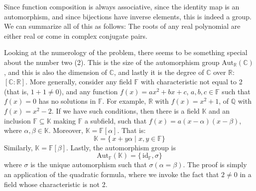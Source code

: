 \documentclass{article}                                                        %
\begin{document}
            Since function composition is always associative, since the identity
            map is an automorphism, and since bijections have inverse elements,
            this is indeed a group. We can summarize all of this as follows:
            The roots of any real polynomial are either real or come in complex
            conjugate pairs.
            \par\hfill\par
            Looking at the numerology of the problem, there seems to be
            something special about the number two (2). This is the size of the
            automorphism group $\textrm{Aut}_{\mathbb{R}}(\mathbb{C})$, and
            this is also the dimension of $\mathbb{C}$, and lastly it is the
            degree of $\mathbb{C}$ over $\mathbb{R}$: $[\mathbb{C}:\mathbb{R}]$.
            More generally, consider any field $\mathbb{F}$ with characteristic
            not equal to 2 (that is, $1+1\ne{0}$), and any function
            $f(x)=ax^{2}+bx+c$, $a,b,c\in\mathbb{F}$ such that $f(x)=0$ has no
            solutions in $\mathbb{F}$. For example, $\mathbb{R}$ with
            $f(x)=x^{2}+1$, of $\mathbb{Q}$ with $f(x)=x^{2}-2$. If we have
            such conditions, then there is a field $\mathbb{K}$ and an inclusion
            $\mathbb{F}\subseteq\mathbb{K}$ making $\mathbb{F}$ a subfield,
            such that $f(x)=a(x-\alpha)(x-\beta)$, where
            $\alpha,\beta\in\mathbb{K}$. Moreover,
            $\mathbb{K}=\mathbb{F}[\alpha]$. That is:
            \begin{equation}
                \mathbb{K}=\{\,x+y\alpha\;|\;x,y\in\mathbb{F}\}
            \end{equation}
            Similarly, $\mathbb{K}=\mathbb{F}[\beta]$. Lastly, the automorphism
            group is
            \begin{equation}
                \textrm{Aut}_{\mathbb{F}}(\mathbb{K})
                =\{\,\textrm{id}_{\mathbb{F}},\sigma\}
            \end{equation}
            where $\sigma$ is the unique automorphism such that
            $\sigma(\alpha=\beta)$. The proof is simply an application of the
            quadratic formula, where we invoke the fact that $2\ne{0}$ in a
            field whose characteristic is not 2.
\end{document}
